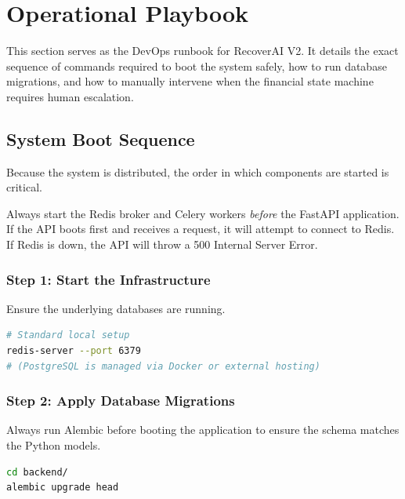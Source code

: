 
\section{Operational Playbook}

\begin{tcolorbox}[summarybox={\iconGear[1.5] Operating the System}]
\color{textdark}
This section serves as the DevOps runbook for RecoverAI V2. It details the exact sequence of commands required to boot the system safely, how to run database migrations, and how to manually intervene when the financial state machine requires human escalation.
\end{tcolorbox}

\vspace{0.8cm}

\subsection{System Boot Sequence}

Because the system is distributed, the order in which components are started is critical.

\begin{tcolorbox}[warningbox={Start the Workers First}]
Always start the Redis broker and Celery workers \textit{before} the FastAPI application. If the API boots first and receives a request, it will attempt to connect to Redis. If Redis is down, the API will throw a 500 Internal Server Error.
\end{tcolorbox}

\subsubsection{Step 1: Start the Infrastructure}
Ensure the underlying databases are running.
\begin{lstlisting}[language=bash]
# Standard local setup
redis-server --port 6379
# (PostgreSQL is managed via Docker or external hosting)
\end{lstlisting}

\subsubsection{Step 2: Apply Database Migrations}
Always run Alembic before booting the application to ensure the schema matches the Python models.
\begin{lstlisting}[language=bash]
cd backend/
alembic upgrade head
\end{lstlisting}

